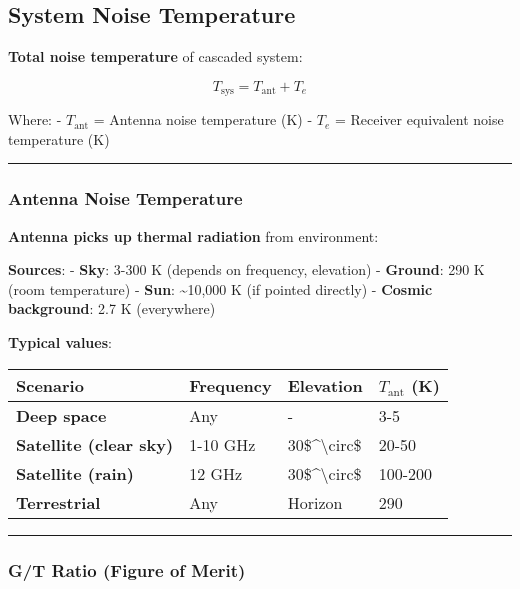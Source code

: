 \subsection{System Noise Temperature}

\textbf{Total noise temperature} of cascaded system:

\[
T_{\text{sys}} = T_{\text{ant}} + T_e
\]

Where: - \(T_{\text{ant}}\) = Antenna noise temperature (K) - \(T_e\) =
Receiver equivalent noise temperature (K)

\begin{center}\rule{0.5\linewidth}{0.5pt}\end{center}

\subsubsection{Antenna Noise
Temperature}\label{antenna-noise-temperature}

\textbf{Antenna picks up thermal radiation} from environment:

\textbf{Sources}: - \textbf{Sky}: 3-300 K (depends on frequency,
elevation) - \textbf{Ground}: 290 K (room temperature) - \textbf{Sun}:
\textasciitilde10,000 K (if pointed directly) - \textbf{Cosmic
background}: 2.7 K (everywhere)

\textbf{Typical values}:

{\def\LTcaptype{} %
\begin{longtable}[]{@{}llll@{}}
\toprule\noalign{}
Scenario & Frequency & Elevation & \(T_{\text{ant}}\) (K) \\
\midrule\noalign{}
\endhead
\bottomrule\noalign{}
\endlastfoot
\textbf{Deep space} & Any & - & 3-5 \\
\textbf{Satellite (clear sky)} & 1-10 GHz &
30\$\^{}\textbackslash circ\$ & 20-50 \\
\textbf{Satellite (rain)} & 12 GHz & 30\$\^{}\textbackslash circ\$ &
100-200 \\
\textbf{Terrestrial} & Any & Horizon & 290 \\
\end{longtable}
}

\begin{center}\rule{0.5\linewidth}{0.5pt}\end{center}

\subsubsection{G/T Ratio (Figure of
Merit)}\label{gt-ratio-figure-of-merit}

